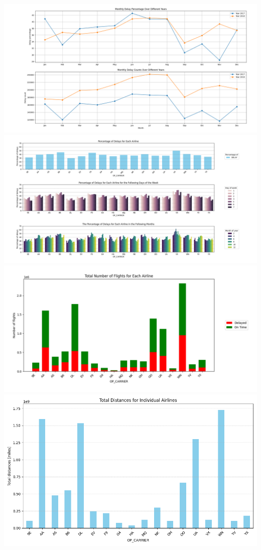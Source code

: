\documentclass{article}
\begin{document}
	\includegraphics[scale=0.22]{plot1}
	\includegraphics[scale=0.25]{plot2}
	\includegraphics[scale=0.4]{plot3}
	\includegraphics[scale=0.4]{plot4}	
\end{document}
